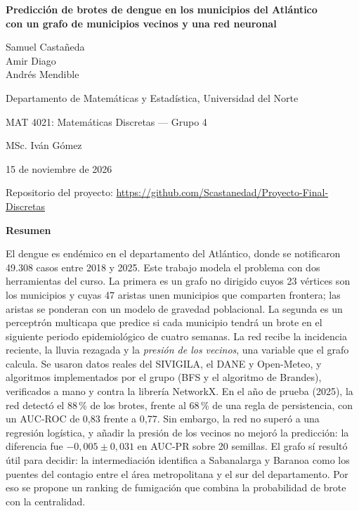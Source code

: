 \documentclass[11pt,letterpaper]{article}
\begin{document}
\begin{titlepage}
\centering
\vspace*{3.5cm}
{\large\bfseries Predicción de brotes de dengue en los municipios del Atlántico\\[2pt]
con un grafo de municipios vecinos y una red neuronal\par}
\vspace{2cm}
{Samuel Castañeda\\
{Amir Diago}\\
{Andrés Mendible}\\}
\vspace{1cm}
{Departamento de Matemáticas y Estadística, Universidad del Norte\par}
\vspace{0.4cm}
{MAT 4021: Matemáticas Discretas — Grupo 4\par}
\vspace{0.4cm}
{MSc. Iván Gómez\par}
\vspace{0.4cm}
{15 de noviembre de 2026\par}
\vspace{1.2cm}
{\small Repositorio del proyecto: \url{https://github.com/Scastanedad/Proyecto-Final-Discretas}\par}
\end{titlepage}

\begin{center}{\bfseries Resumen}\end{center}
\noindent
El dengue es endémico en el departamento del Atlántico, donde se notificaron 49.308 casos entre 2018 y 2025. Este trabajo modela el problema con dos herramientas del curso. La primera es un grafo no dirigido cuyos 23 vértices son los municipios y cuyas 47 aristas unen municipios que comparten frontera; las aristas se ponderan con un modelo de gravedad poblacional. La segunda es un perceptrón multicapa que predice si cada municipio tendrá un brote en el siguiente periodo epidemiológico de cuatro semanas. La red recibe la incidencia reciente, la lluvia rezagada y la \emph{presión de los vecinos}, una variable que el grafo calcula. Se usaron datos reales del SIVIGILA, el DANE y Open-Meteo, y algoritmos implementados por el grupo (BFS y el algoritmo de Brandes), verificados a mano y contra la librería NetworkX. En el año de prueba (2025), la red detectó el 88\,\% de los brotes, frente al 68\,\% de una regla de persistencia, con un AUC-ROC de 0,83 frente a 0,77. Sin embargo, la red no superó a una regresión logística, y añadir la presión de los vecinos no mejoró la predicción: la diferencia fue $-0{,}005 \pm 0{,}031$ en AUC-PR sobre 20 semillas. El grafo sí resultó útil para decidir: la intermediación identifica a Sabanalarga y Baranoa como los puentes del contagio entre el área metropolitana y el sur del departamento. Por eso se propone un ranking de fumigación que combina la probabilidad de brote con la centralidad.
\end{document}
